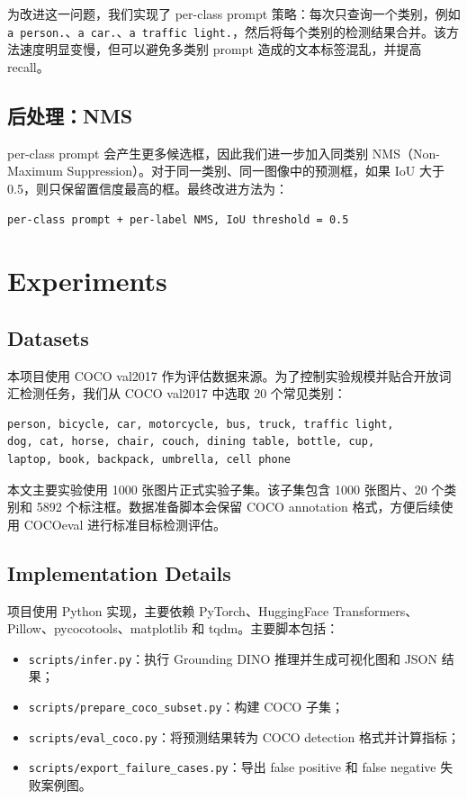 \documentclass[UTF8,a4paper,11pt]{ctexart}
\begin{document}
为改进这一问题，我们实现了 per-class prompt 策略：每次只查询一个类别，例如 \texttt{a person.}、\texttt{a car.}、\texttt{a traffic light.}，然后将每个类别的检测结果合并。该方法速度明显变慢，但可以避免多类别 prompt 造成的文本标签混乱，并提高 recall。

\subsection{后处理：NMS}

per-class prompt 会产生更多候选框，因此我们进一步加入同类别 NMS（Non-Maximum Suppression）。对于同一类别、同一图像中的预测框，如果 IoU 大于 0.5，则只保留置信度最高的框。最终改进方法为：

\begin{center}
\texttt{per-class prompt + per-label NMS, IoU threshold = 0.5}
\end{center}

\section{Experiments}

\subsection{Datasets}

本项目使用 COCO val2017 作为评估数据来源。为了控制实验规模并贴合开放词汇检测任务，我们从 COCO val2017 中选取 20 个常见类别：

\begin{verbatim}
person, bicycle, car, motorcycle, bus, truck, traffic light,
dog, cat, horse, chair, couch, dining table, bottle, cup,
laptop, book, backpack, umbrella, cell phone
\end{verbatim}

本文主要实验使用 1000 张图片正式实验子集。该子集包含 1000 张图片、20 个类别和 5892 个标注框。数据准备脚本会保留 COCO annotation 格式，方便后续使用 COCOeval 进行标准目标检测评估。

\subsection{Implementation Details}

项目使用 Python 实现，主要依赖 PyTorch、HuggingFace Transformers、Pillow、pycocotools、matplotlib 和 tqdm。主要脚本包括：

\begin{itemize}
  \item \texttt{scripts/infer.py}：执行 Grounding DINO 推理并生成可视化图和 JSON 结果；
  \item \texttt{scripts/prepare\_coco\_subset.py}：构建 COCO 子集；
  \item \texttt{scripts/eval\_coco.py}：将预测结果转为 COCO detection 格式并计算指标；
  \item \texttt{scripts/export\_failure\_cases.py}：导出 false positive 和 false negative 失败案例图。
\end{itemize}
\end{document}
